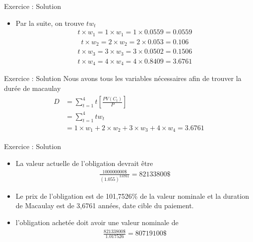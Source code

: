\documentclass[10pt,a4paper]{beamer}
\begin{document}
\begin{frame}{Exercice : Solution}
\begin{itemize}[label=\bullet]
\item Par la suite, on trouve $tw_t$
\begin{align*}
t \times w_1=1 \times w_1 =1 \times 0.0559 = 0.0559                                       
\end{align*} 
\begin{align*}
t \times w_2= 2 \times w_2 =2 \times 0.053  = 0.106                                
\end{align*} 
\begin{align*}
t \times w_3= 3 \times w_3 =3 \times 0.0502 = 0.1506                             
\end{align*} 
\begin{align*}
t \times w_4= 4 \times w_4 =4 \times 0.8409  = 3.6761                           
\end{align*} 
\end{itemize}
\end{frame}
\begin{frame}{Exercice : Solution}
Nous avons tous les variables nécessaires afin de trouver la durée de macaulay 
\begin{align*}
\begin{split}
D & =\sum_{t=1}^4 t \left[ \frac{PV(C_t)}{P} \right]\\
&=\sum_{t=1}^4 tw_t \\
&=1 \times w_1+2 \times w_2+ 3 \times w_3+4 \times w_4= 3.6761     
\end{split}
\end{align*}
\end{frame}

\begin{frame}{Exercice : Solution}
\begin{itemize}[label=\bullet]
\item La valeur actuelle de l'obligation devrait être
\begin{align*}
\frac{100 000 000\$}{(1.055)^{3.6761}}=82 133 800\$
\end{align*}
\item Le prix de l'obligation est de 101,7526\% de la valeur nominale et la duration de Macaulay est de 3,6761 années,  date cible du paiement.
\item l'obligation achetée doit avoir une valeur nominale de
\begin{align*}
\frac{82 133 800\$}{1.017526}=80 719 100\$
\end{align*}
\end{itemize}
\end{frame}
\end{document}
